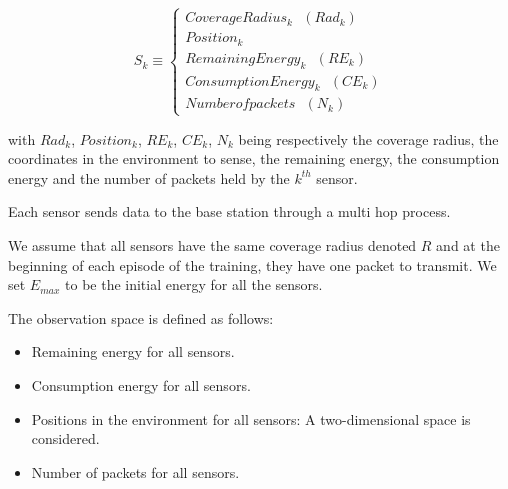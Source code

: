 \documentclass[12pt, onecolumn, journal]{IEEEtran}
\begin{document}
\begin{equation} 
S_k \equiv 
\begin{cases}
CoverageRadius_k \text{ } \left(Rad_k\right)  \\
Position_k \\
RemainingEnergy_k \text{ } \left(RE_k\right) \\
ConsumptionEnergy_k \text{ } \left(CE_k\right) \\
Number of packets \text{ } \left(N_k\right) 
\end{cases}
\end{equation}

with $Rad_k$, $Position_k$, $RE_k$, $CE_k$, $N_k$ being respectively the coverage radius, the coordinates in the environment to sense, the remaining energy, the consumption energy and the number of packets held by the $k^{th}$ sensor.  

Each sensor sends data to the base station through a multi hop process.

We assume that all sensors have the same coverage radius denoted $R$ and at the beginning of each episode of the training, they have one packet to transmit. We set $E_{max}$ to be the initial energy for all the sensors. 

The observation space is defined as follows:
\begin{itemize}
    \item Remaining energy for all sensors.
    \item Consumption energy for all sensors.
    \item Positions in the environment for all sensors: A two-dimensional space is considered.
    \item Number of packets for all sensors.
\end{itemize}	
    
\end{document}
